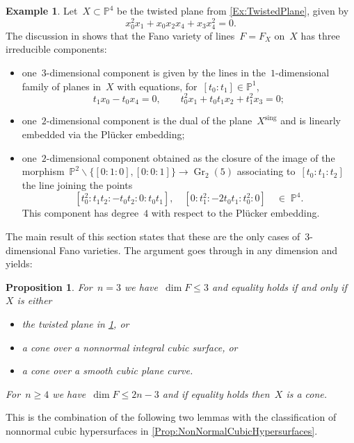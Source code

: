 \documentclass[a4paper]{amsart}
\newcommand{\bbP}{\mathbb{P}}
\newcommand{\sing}{{\mathrm{sing}}}
\DeclareMathOperator{\Gr}{Gr}
\renewcommand{\le}{\leqslant}
\renewcommand{\ge}{\geqslant}
\theoremstyle{plain}
\newtheorem{proposition}[theorem]{Proposition}
\theoremstyle{definition}
\newtheorem{example}[theorem]{Example}
\numberwithin{equation}{section}
\begin{document}
\begin{example} \label{Ex:ConesOverTwistedPlane} Let~$X \subset \bbP^4$ be the twisted plane from \cref{Ex:TwistedPlane}, given by
\[  x_0^2 x_1+x_0 x_2 x_4+x_3 x_4^2=0. \]
The discussion in \cite[sect.~2.2.9]{RuledVarieties} shows that the Fano variety of lines~$F = F_X$ on~$X$ has three irreducible components:
\begin{itemize}
\item one~$3$-dimensional component is given by the lines in the~$1$-dimensional family of planes in~$X$ with equations, for~$[t_0 : t_1] \in \bbP^1$,
\[
t_1 x_0 - t_0 x_4 = 0, \qquad t_0^2 x_1 + t_0 t_1 x_2 + t_1^2 x_3 = 0;
\]
\item one~$2$-dimensional component is the dual of the plane~$X^\sing$ and is linearly embedded via the Pl\"ucker embedding; \smallskip
\item one~$2$-dimensional component obtained as the closure of the image of the morphism~$\bbP^2 \smallsetminus \{ [0:1:0], [0:0:1]\} \to \Gr_2(5)$ associating to~$[t_0 : t_1: t_2]$ the line joining the points
\[ [t_0^2 : t_1 t_2 : - t_0 t_2 : 0 : t_0 t_1], \quad [0 : t_1^2 : - 2 t_0 t_1 : t_0^2 : 0] \quad \in \; \bbP^4. \]
This component has degree~$4$ with respect to the Pl\"ucker embedding.
\end{itemize}
\end{example}

\noindent
The main result of this section states that these are the only cases of~$3$-dimensional Fano varieties. The argument goes through in any dimension and yields:


\begin{proposition} \label{Prop:ExpectedDimensionCubicHypersurface} For~$n = 3$ we have~$\dim F \le 3$ and equality holds if and only if~$X$ is either
\begin{itemize}
\item the twisted plane in \cref{Ex:ConesOverTwistedPlane}, or 
\item a cone over a nonnormal integral cubic surface, or 
\item a cone over a smooth cubic plane curve.
\end{itemize}
For~$n \ge 4$ we have~$\dim F \le 2n-3$ and if equality holds then~$X$ is a cone.
\end{proposition}

This is the combination of the following two lemmas with the classification of nonnormal cubic hypersurfaces in \cref{Prop:NonNormalCubicHypersurfaces}.
\end{document}
